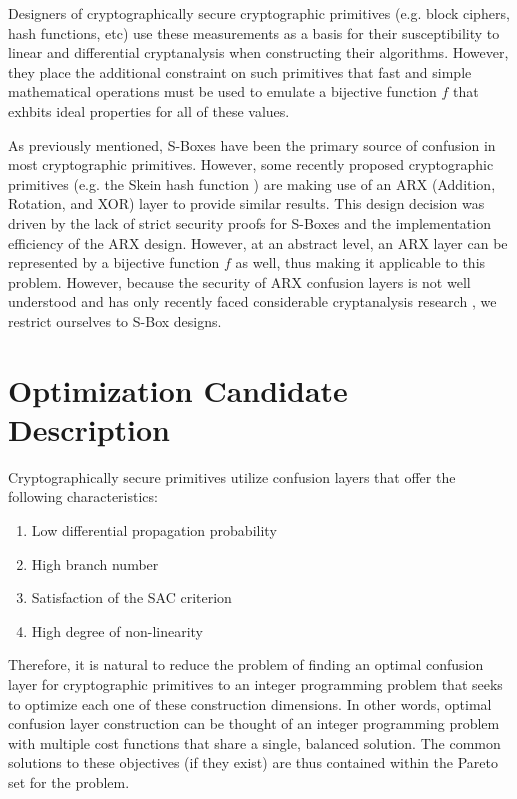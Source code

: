 \documentclass[11pt]{article}
\begin{document}
Designers of cryptographically secure cryptographic primitives (e.g. block ciphers, hash functions, etc) use these measurements as a basis for their susceptibility to linear and differential cryptanalysis when constructing their algorithms. However, they place the additional constraint on such primitives that fast and simple mathematical operations must be used to emulate a bijective function $f$ that exhbits ideal properties for all of these values.

As previously mentioned, S-Boxes have been the primary source of confusion in most cryptographic primitives. However, some recently proposed cryptographic primitives (e.g. the Skein hash function \cite{Ferguson09theskein}) are making use of an ARX (Addition, Rotation, and XOR) layer to provide similar results. This design decision was driven by the lack of strict security proofs for S-Boxes and the implementation efficiency of the ARX design. However, at an abstract level, an ARX layer can be represented by a bijective function $f$ as well, thus making it applicable to this problem. However, because the security of ARX confusion layers is not well understood and has only recently faced considerable cryptanalysis research \cite{Khovratovich:2010:RCA:1876089.1876116}, we restrict ourselves to S-Box designs.

\section{Optimization Candidate Description}
Cryptographically secure primitives utilize confusion layers that offer the following characteristics:

\begin{enumerate}
	\item Low differential propagation probability
	\item High branch number
	\item Satisfaction of the SAC criterion
	\item High degree of non-linearity
\end{enumerate}

Therefore, it is natural to reduce the problem of finding an optimal confusion layer for cryptographic primitives to an integer programming problem that seeks to optimize each one of these construction dimensions. In other words, optimal confusion layer construction can be thought of an integer programming problem with multiple cost functions that share a single, balanced solution. The common solutions to these objectives (if they exist) are thus contained within the Pareto set for the problem.
\end{document}
